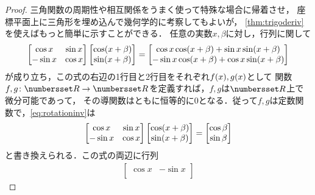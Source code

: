 \documentclass[11pt,a4paper]{ltjsarticle}
\theoremstyle{definition}
\begin{document}
\begin{proof}
  三角関数の周期性や相互関係をうまく使って特殊な場合に帰着させ，
  座標平面上に三角形を埋め込んで幾何学的に考察してもよいが，
  \cref{thm:trigoderiv}を使えばもっと簡単に示すことができる．
  任意の実数$x, \beta$に対し，行列に関して
  \begin{align}
    \begin{bmatrix}
      \cos x & \sin x \\
      - \sin x & \cos x \\
    \end{bmatrix}
    \begin{bmatrix}
      \apply{\cos}{x + \beta} \\
      \apply{\sin}{x + \beta} \\
    \end{bmatrix}
    =
    \begin{bmatrix}
      \cos x \apply{\cos}{x + \beta} + \sin x \apply{\sin}{x + \beta} \\
      - \sin x \apply{\cos}{x + \beta} + \cos x \apply{\sin}{x + \beta} \\
    \end{bmatrix}
    \label{eq:rotationinv}
  \end{align}
  が成り立ち，この式の右辺の1行目と2行目をそれぞれ$\apply{f}{x}, \apply{g}{x}$として
  関数$f,g \colon \Real \to \Real$を定義すれば，$f,g$は$\Real$上で微分可能であって，
  その導関数はともに恒等的に0となる．従って$f,g$は定数関数で，\cref{eq:rotationinv}は
  \begin{align}
    \begin{bmatrix}
      \cos x & \sin x \\
      - \sin x & \cos x \\
    \end{bmatrix}
    \begin{bmatrix}
      \apply{\cos}{x + \beta} \\
      \apply{\sin}{x + \beta} \\
    \end{bmatrix}
    =
    \begin{bmatrix}
      \cos \beta \\
      \sin \beta \\
    \end{bmatrix}
    \label{eq:rotationinvbeta}
  \end{align}
  と書き換えられる．この式の両辺に行列
  \begin{align*}
    \begin{bmatrix}
      \cos x & - \sin x \\

\end{bmatrix}
\end{align*}
\end{proof}
\end{document}
